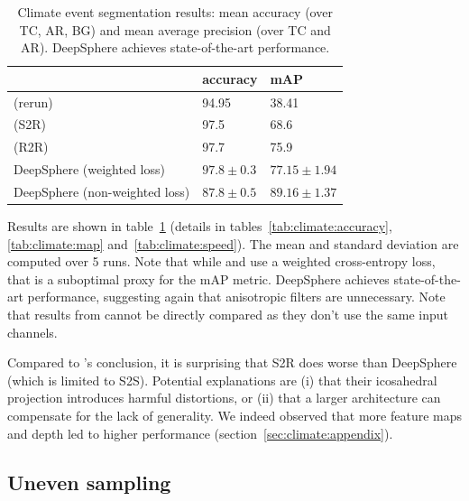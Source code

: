 \documentclass{article} %
\newcommand{\tabref}[1]{table~\ref{tab:#1}}
\newcommand{\secref}[1]{section~\ref{sec:#1}}
\begin{document}
\begin{table}
	\centering
	\begin{tabular}{l l l}
	\toprule
	& accuracy & mAP \\
	\midrule
	\cite{jiang2019sphericalcnn} (rerun) & 94.95 & 38.41 \\
	\cite{cohen2019gauge} (S2R) & 97.5 & 68.6 \\
	\cite{cohen2019gauge} (R2R) & 97.7 & 75.9 \\
	DeepSphere (weighted loss) & $97.8\pm 0.3$ & $77.15\pm 1.94$ \\
	DeepSphere (non-weighted loss) & $87.8\pm 0.5$ & $89.16\pm 1.37$ \\
	\bottomrule
	\end{tabular}
	\caption{
		Climate event segmentation results: mean accuracy (over TC, AR, BG) and mean average precision (over TC and AR).
		DeepSphere achieves state-of-the-art performance. %
	}
	\label{tab:climate}
\end{table}

Results are shown in \tabref{climate} (details in tables~\ref{tab:climate:accuracy}, \ref{tab:climate:map} and~\ref{tab:climate:speed}).
The mean and standard deviation are computed over 5 runs.
Note that while \citet{jiang2019sphericalcnn} and \citet{cohen2019gauge} use a weighted cross-entropy loss, that is a suboptimal proxy for the mAP metric.
DeepSphere achieves state-of-the-art performance, suggesting again that anisotropic filters are unnecessary.
Note that results from \citet{mudigonda2017climateevents} cannot be directly compared as they don't use the same input channels.

Compared to \citet{cohen2019gauge}'s conclusion, it is surprising that S2R does worse than DeepSphere (which is limited to S2S).
Potential explanations are (i) that their icosahedral projection introduces harmful distortions, or (ii) that a larger architecture can compensate for the lack of generality. %
We indeed observed that more feature maps and depth led to higher performance (\secref{climate:appendix}).

\subsection{Uneven sampling} \label{sec:exp:ghcn}
\end{document}
